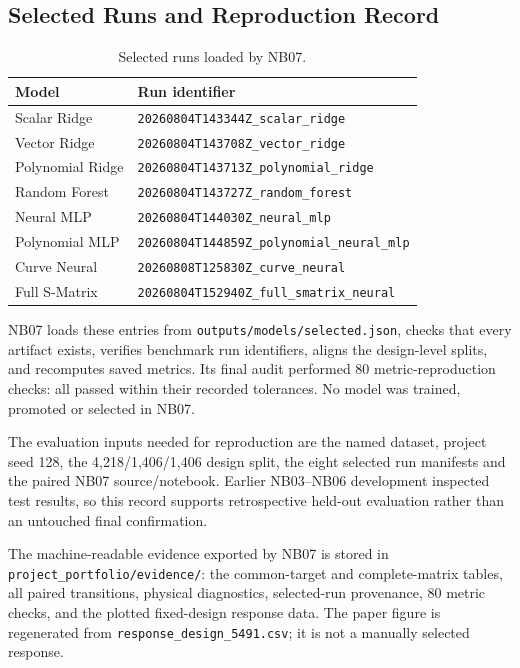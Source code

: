 \subsection{Selected Runs and Reproduction Record}
\begin{table}[t]
    \caption{Selected runs loaded by NB07.}
    \label{tab:appendix-selected-runs}
    \centering
    \scriptsize
    \begin{tabular}{@{}ll@{}}
        \toprule
        Model & Run identifier \\
        \midrule
        Scalar Ridge     & \nolinkurl{20260804T143344Z_scalar_ridge} \\
        Vector Ridge     & \nolinkurl{20260804T143708Z_vector_ridge} \\
        Polynomial Ridge & \nolinkurl{20260804T143713Z_polynomial_ridge} \\
        Random Forest    & \nolinkurl{20260804T143727Z_random_forest} \\
        Neural MLP       & \nolinkurl{20260804T144030Z_neural_mlp} \\
        Polynomial MLP   & \nolinkurl{20260804T144859Z_polynomial_neural_mlp} \\
        Curve Neural     & \nolinkurl{20260808T125830Z_curve_neural} \\
        Full S-Matrix    & \nolinkurl{20260804T152940Z_full_smatrix_neural} \\
        \bottomrule
    \end{tabular}
\end{table}

NB07 loads these entries from \nolinkurl{outputs/models/selected.json}, checks
that every artifact exists, verifies benchmark run identifiers, aligns the
design-level splits, and recomputes saved metrics. Its final audit performed 80
metric-reproduction checks: all passed within their recorded tolerances. No
model was trained, promoted or selected in NB07.

The evaluation inputs needed for reproduction are the named dataset, project
seed 128, the 4,218/1,406/1,406 design split, the eight selected run manifests
and the paired NB07 source/notebook. Earlier NB03--NB06 development inspected
test results, so this record supports retrospective held-out evaluation rather
than an untouched final confirmation.

The machine-readable evidence exported by NB07 is stored in
\nolinkurl{project_portfolio/evidence/}: the common-target and complete-matrix
tables, all paired transitions, physical diagnostics, selected-run provenance,
80 metric checks, and the plotted fixed-design response data. The paper figure
is regenerated from \nolinkurl{response_design_5491.csv}; it is not a manually
selected response.
